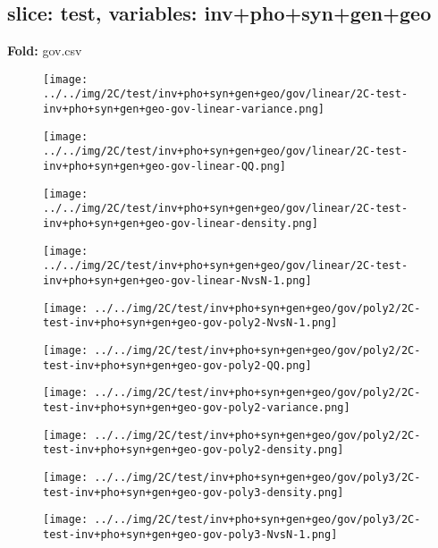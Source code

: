 \subsection{slice: test, variables: inv+pho+syn+gen+geo}
\textbf{Fold:} gov.csv
\begin{figure}[H]
\centering	\texttt{[image: ../../img/2C/test/inv+pho+syn+gen+geo/gov/linear/2C-test-inv+pho+syn+gen+geo-gov-linear-variance.png]}
\end{figure}
\begin{figure}[H]
\centering	\texttt{[image: ../../img/2C/test/inv+pho+syn+gen+geo/gov/linear/2C-test-inv+pho+syn+gen+geo-gov-linear-QQ.png]}
\end{figure}
\begin{figure}[H]
\centering	\texttt{[image: ../../img/2C/test/inv+pho+syn+gen+geo/gov/linear/2C-test-inv+pho+syn+gen+geo-gov-linear-density.png]}
\end{figure}
\begin{figure}[H]
\centering	\texttt{[image: ../../img/2C/test/inv+pho+syn+gen+geo/gov/linear/2C-test-inv+pho+syn+gen+geo-gov-linear-NvsN-1.png]}
\end{figure}
\begin{figure}[H]
\centering	\texttt{[image: ../../img/2C/test/inv+pho+syn+gen+geo/gov/poly2/2C-test-inv+pho+syn+gen+geo-gov-poly2-NvsN-1.png]}
\end{figure}
\begin{figure}[H]
\centering	\texttt{[image: ../../img/2C/test/inv+pho+syn+gen+geo/gov/poly2/2C-test-inv+pho+syn+gen+geo-gov-poly2-QQ.png]}
\end{figure}
\begin{figure}[H]
\centering	\texttt{[image: ../../img/2C/test/inv+pho+syn+gen+geo/gov/poly2/2C-test-inv+pho+syn+gen+geo-gov-poly2-variance.png]}
\end{figure}
\begin{figure}[H]
\centering	\texttt{[image: ../../img/2C/test/inv+pho+syn+gen+geo/gov/poly2/2C-test-inv+pho+syn+gen+geo-gov-poly2-density.png]}
\end{figure}
\begin{figure}[H]
\centering	\texttt{[image: ../../img/2C/test/inv+pho+syn+gen+geo/gov/poly3/2C-test-inv+pho+syn+gen+geo-gov-poly3-density.png]}
\end{figure}
\begin{figure}[H]
\centering	\texttt{[image: ../../img/2C/test/inv+pho+syn+gen+geo/gov/poly3/2C-test-inv+pho+syn+gen+geo-gov-poly3-NvsN-1.png]}
\end{figure}
